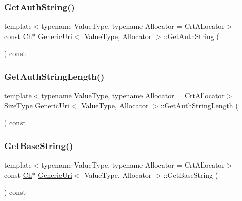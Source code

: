 \subsubsection{\texorpdfstring{Get\+Auth\+String()}{GetAuthString()}}
{\footnotesize\ttfamily template$<$typename Value\+Type, typename Allocator = Crt\+Allocator$>$ \\
const \hyperlink{classGenericUri_a20d0602cff62211d89bc4b25963beeee}{Ch}$\ast$ \hyperlink{classGenericUri}{Generic\+Uri}$<$ Value\+Type, Allocator $>$\+::Get\+Auth\+String (\begin{DoxyParamCaption}{ }\end{DoxyParamCaption}) const\hspace{0.3cm}{\ttfamily [inline]}}

\mbox{\label{classGenericUri_a6c7e9223173511e2c8addf0a5fbb4719}} 
\subsubsection{\texorpdfstring{Get\+Auth\+String\+Length()}{GetAuthStringLength()}}
{\footnotesize\ttfamily template$<$typename Value\+Type, typename Allocator = Crt\+Allocator$>$ \\
\hyperlink{rapidjson_8h_a5ed6e6e67250fadbd041127e6386dcb5}{Size\+Type} \hyperlink{classGenericUri}{Generic\+Uri}$<$ Value\+Type, Allocator $>$\+::Get\+Auth\+String\+Length (\begin{DoxyParamCaption}{ }\end{DoxyParamCaption}) const\hspace{0.3cm}{\ttfamily [inline]}}

\mbox{\label{classGenericUri_aba5afd6c680598660fa74c5b4107c563}} 
\subsubsection{\texorpdfstring{Get\+Base\+String()}{GetBaseString()}}
{\footnotesize\ttfamily template$<$typename Value\+Type, typename Allocator = Crt\+Allocator$>$ \\
const \hyperlink{classGenericUri_a20d0602cff62211d89bc4b25963beeee}{Ch}$\ast$ \hyperlink{classGenericUri}{Generic\+Uri}$<$ Value\+Type, Allocator $>$\+::Get\+Base\+String (\begin{DoxyParamCaption}{ }\end{DoxyParamCaption}) const\hspace{0.3cm}{\ttfamily [inline]}}


